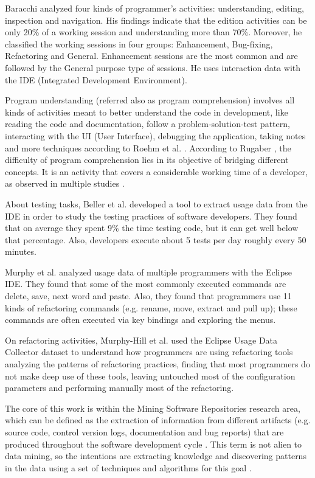 \documentclass[conference]{IEEEtran}
\begin{document}
Baracchi \cite{B14} analyzed four kinds of programmer's activities: understanding, editing, inspection and navigation. His findings indicate that the edition activities can be only 20\% of a working session and understanding more than 70\%. Moreover, he classified the working sessions in four groups: Enhancement, Bug-fixing, Refactoring and General. Enhancement sessions are the most common and are followed by the General purpose type of sessions. He uses interaction data with the IDE (Integrated Development Environment).

Program understanding (referred also as program comprehension) involves all kinds of activities meant to better understand the code in development, like reading the code and documentation, follow a problem-solution-test pattern, interacting with the UI (User Interface), debugging the application, taking notes and more techniques according to Roehm et al. \cite{RTK12}. According to Rugaber \cite{R95}, the difficulty of program comprehension lies in its objective of bridging different concepts. It is an activity that covers a considerable working time of a developer, as observed in multiple studies \cite{FH83, BGZ15, B14, MMLK14}.

About testing tasks, Beller et al. \cite{BGZ15} developed a tool to extract usage data from the IDE in order to study the testing practices of software developers. They found that on average they spent 9\% the time testing code, but it can get well below that percentage. Also, developers execute about 5 tests per day roughly every 50 minutes.

Murphy et al. \cite{MKF06} analyzed usage data of multiple programmers with the Eclipse IDE. They found that some of the most commonly executed commands are delete, save, next word and paste. Also, they found that programmers use 11 kinds of refactoring commands (e.g. rename, move, extract and pull up); these commands are often executed via key bindings and exploring the menus.

On refactoring activities, Murphy-Hill et al. \cite{MPB12} used the Eclipse Usage Data Collector dataset to understand how programmers are using refactoring tools analyzing the patterns of refactoring practices, finding that most programmers do not make deep use of these tools, leaving untouched most of the configuration parameters and performing manually most of the refactoring.

The core of this work is within the Mining Software Repositories research area, which can be defined as the extraction of information from different artifacts (e.g. source code, control version logs, documentation and bug reports) that are produced throughout the software development cycle \cite{H04}. This term is not alien to data mining, so the intentions are extracting knowledge and discovering patterns in the data using a set of techniques and algorithms for this goal \cite{FPG96}.
\end{document}
